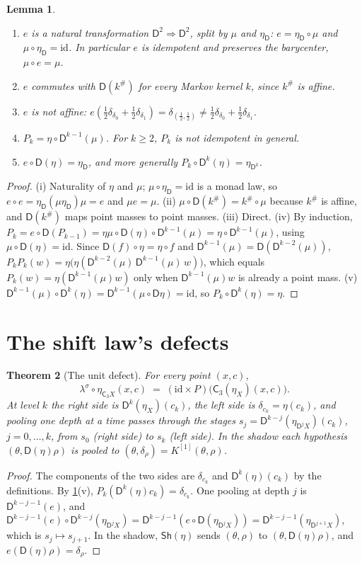 \documentclass[11pt]{article}
\newtheorem{theorem}{Theorem}[section]
\newtheorem{lemma}[theorem]{Lemma}
\theoremstyle{definition}
\newcommand{\D}{\mathsf D}
\newcommand{\C}{\mathsf C}
\newcommand{\Sh}{\mathsf{Sh}}
\newcommand{\ls}{\lambda^{\sigma}}
\newcommand{\id}{\mathrm{id}}
\begin{document}
\begin{lemma}\label{lem:e}
\begin{enumerate}[label=(\roman*),nosep]
\item $e$ is a natural transformation $\D^2\Rightarrow\D^2$, split by $\mu$ and $\eta_\D$: $e=\eta_\D\circ\mu$ and $\mu\circ\eta_\D=\id$. In
  particular $e$ is idempotent and preserves the barycenter, $\mu\circ e=\mu$.
\item $e$ commutes with $\D(k^\#)$ for every Markov kernel $k$, since $k^\#$ is affine.
\item $e$ is not affine: $e(\tfrac12\delta_{\delta_0}+\tfrac12\delta_{\delta_1})=\delta_{(\frac12,\frac12)}\ne\tfrac12\delta_{\delta_0}+\tfrac12\delta_{\delta_1}$.
\item $P_k=\eta\circ\D^{k-1}(\mu)$. For $k\ge2$, $P_k$ is not idempotent in general.
\item $e\circ\D(\eta)=\eta_\D$, and more generally $P_k\circ\D^k(\eta)=\eta_{\D^k}$.
\end{enumerate}
\end{lemma}
\begin{proof}
(i) Naturality of $\eta$ and $\mu$; $\mu\circ\eta_\D=\id$ is a monad law, so $e\circ e=\eta_\D(\mu\eta_\D)\mu=e$ and $\mu e=\mu$. (ii)
$\mu\circ\D(k^\#)=k^\#\circ\mu$ because $k^\#$ is affine, and $\D(k^\#)$ maps point masses to point masses. (iii) Direct. (iv) By
induction, $P_k=e\circ\D(P_{k-1})=\eta\mu\circ\D(\eta)\circ\D^{k-1}(\mu)=\eta\circ\D^{k-1}(\mu)$, using $\mu\circ\D(\eta)=\id$. Since $\D(f)\circ\eta=\eta\circ f$ and $\D^{k-1}(\mu)=\D(\D^{k-2}(\mu))$,
$P_kP_k(w)=\eta\big(\eta(\D^{k-2}(\mu)\,\D^{k-1}(\mu)\,w)\big)$, which equals $P_k(w)=\eta(\D^{k-1}(\mu)w)$ only when $\D^{k-1}(\mu)w$ is
already a point mass. (v) $\D^{k-1}(\mu)\circ\D^k(\eta)=\D^{k-1}(\mu\circ\D\eta)=\id$, so $P_k\circ\D^k(\eta)=\eta$.
\end{proof}

\section{The shift law's defects}
\begin{theorem}[The unit defect]\label{thm:unit}
For every point $(x,c)$,
\[
\ls\circ\eta_{\C_3X}(x,c)\;=\;(\id\times P)\big(\C_3(\eta_X)(x,c)\big).
\]
At level $k$ the right side is $\D^k(\eta_X)(c_k)$, the left side is $\delta_{c_k}=\eta(c_k)$, and pooling one depth at a time passes
through the stages $s_j=\D^{k-j}(\eta_{\D^jX})(c_k)$, $j=0,\dots,k$, from $s_0$ (right side) to $s_k$ (left side). In the shadow each
hypothesis $(\theta,\D(\eta)\rho)$ is pooled to $(\theta,\delta_\rho)=K^{[1]}(\theta,\rho)$.
\end{theorem}
\begin{proof}
The components of the two sides are $\delta_{c_k}$ and $\D^k(\eta)(c_k)$ by the definitions. By \cref{lem:e}(v),
$P_k(\D^k(\eta)c_k)=\delta_{c_k}$. One pooling at depth $j$ is $\D^{k-j-1}(e)$, and
$\D^{k-j-1}(e)\circ\D^{k-j}(\eta_{\D^jX})=\D^{k-j-1}(e\circ\D(\eta_{\D^jX}))=\D^{k-j-1}(\eta_{\D^{j+1}X})$, which is $s_j\mapsto s_{j+1}$. In the
shadow, $\Sh(\eta)$ sends $(\theta,\rho)$ to $(\theta,\D(\eta)\rho)$, and $e(\D(\eta)\rho)=\delta_\rho$.
\end{proof}
\end{document}

